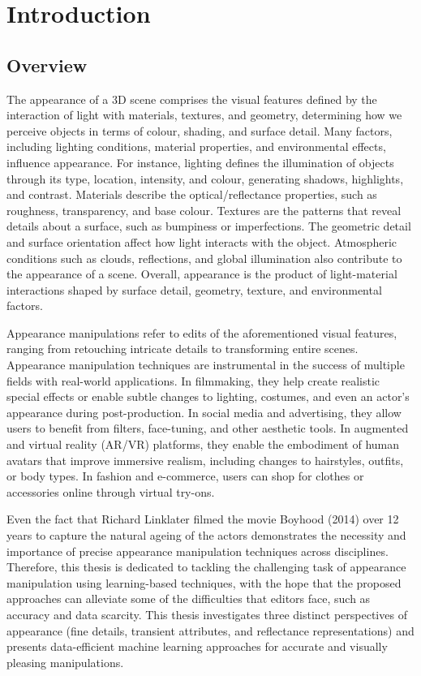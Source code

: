 \chapter{Introduction}






\section{Overview} 

The appearance of a 3D scene comprises the visual features defined by the interaction of light with materials, textures, and geometry, determining how we perceive objects in terms of colour, shading, and surface detail. Many factors, including lighting conditions, material properties, and environmental effects, influence appearance. For instance, lighting defines the illumination of objects through its type, location, intensity, and colour, generating shadows, highlights, and contrast. Materials describe the optical/reflectance properties, such as roughness, transparency, and base colour. Textures are the patterns that reveal details about a surface, such as bumpiness or imperfections. The geometric detail and surface orientation affect how light interacts with the object. Atmospheric conditions such as clouds, reflections, and global illumination also contribute to the appearance of a scene. Overall, appearance is the product of light-material interactions shaped by surface detail, geometry, texture, and environmental factors.
 
Appearance manipulations refer to edits of the aforementioned visual features, ranging from retouching intricate details to transforming entire scenes. Appearance manipulation techniques are instrumental in the success of multiple fields with real-world applications. In filmmaking, they help create realistic special effects or enable subtle changes to lighting, costumes, and even an actor’s appearance during post-production. In social media and advertising, they allow users to benefit from filters, face-tuning, and other aesthetic tools. In augmented and virtual reality (\gls{AR/VR}) platforms, they enable the embodiment of human avatars that improve immersive realism, including changes to hairstyles, outfits, or body types. In fashion and e-commerce, users can shop for clothes or accessories online through virtual try-ons.

Even the fact that Richard Linklater filmed the movie Boyhood (2014) over 12 years to capture the natural ageing of the actors demonstrates the necessity and importance of precise appearance manipulation techniques across disciplines. Therefore, this thesis is dedicated to tackling the challenging task of appearance manipulation using learning-based techniques, with the hope that the proposed approaches can alleviate some of the difficulties that editors face, such as accuracy and data scarcity. This thesis investigates three distinct perspectives of appearance (fine details, transient attributes, and reflectance representations) and presents data-efficient machine learning approaches for accurate and visually pleasing manipulations.


